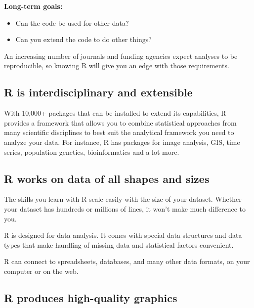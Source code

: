 \documentclass[]{book}
\providecommand{\tightlist}{%
  \setlength{\itemsep}{0pt}\setlength{\parskip}{0pt}}
\begin{document}
\textbf{Long-term goals:}

\begin{itemize}
\tightlist
\item
  Can the code be used for other data?\\
\item
  Can you extend the code to do other things?
\end{itemize}

An increasing number of journals and funding agencies expect analyses to be reproducible, so knowing R will give you an edge with those requirements.

\hypertarget{r-is-interdisciplinary-and-extensible}{%
\subsection*{R is interdisciplinary and extensible}\label{r-is-interdisciplinary-and-extensible}}

With 10,000+ packages that can be installed to extend its capabilities, R provides a framework that allows you to combine statistical approaches from many scientific disciplines to best suit the analytical framework you need to analyze your data. For instance, R has packages for image analysis, GIS, time series, population genetics, bioinformatics and a lot more.

\hypertarget{r-works-on-data-of-all-shapes-and-sizes}{%
\subsection*{R works on data of all shapes and sizes}\label{r-works-on-data-of-all-shapes-and-sizes}}

The skills you learn with R scale easily with the size of your dataset. Whether your dataset has hundreds or millions of lines, it won't make much difference to you.

R is designed for data analysis. It comes with special data structures and data types that make handling of missing data and statistical factors convenient.

R can connect to spreadsheets, databases, and many other data formats, on your computer or on the web.

\hypertarget{r-produces-high-quality-graphics}{%
\subsection*{R produces high-quality graphics}\label{r-produces-high-quality-graphics}}
\end{document}
